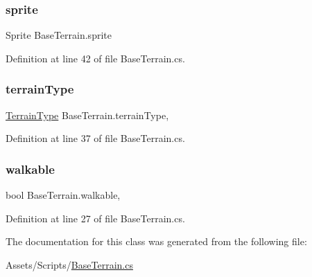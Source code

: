 \subsubsection{\texorpdfstring{sprite}{sprite}}
{\footnotesize\ttfamily Sprite Base\+Terrain.\+sprite\hspace{0.3cm}{\ttfamily [get]}}



Definition at line 42 of file Base\+Terrain.\+cs.

\mbox{\label{class_base_terrain_a381e5f59e57a301a70f79c32cf3ea300}} 
\subsubsection{\texorpdfstring{terrainType}{terrainType}}
{\footnotesize\ttfamily \mbox{\hyperlink{class_base_terrain_a5b782f4de5e1a2ca1343b4aa89a7dc9a}{Terrain\+Type}} Base\+Terrain.\+terrain\+Type\hspace{0.3cm}{\ttfamily [get]}, {\ttfamily [set]}}



Definition at line 37 of file Base\+Terrain.\+cs.

\mbox{\label{class_base_terrain_a403d7a199581bc910ecbf15009b532a6}} 
\subsubsection{\texorpdfstring{walkable}{walkable}}
{\footnotesize\ttfamily bool Base\+Terrain.\+walkable\hspace{0.3cm}{\ttfamily [get]}, {\ttfamily [set]}}



Definition at line 27 of file Base\+Terrain.\+cs.



The documentation for this class was generated from the following file\+:\begin{DoxyCompactItemize}
\item 
Assets/\+Scripts/\mbox{\hyperlink{_base_terrain_8cs}{Base\+Terrain.\+cs}}\end{DoxyCompactItemize}

